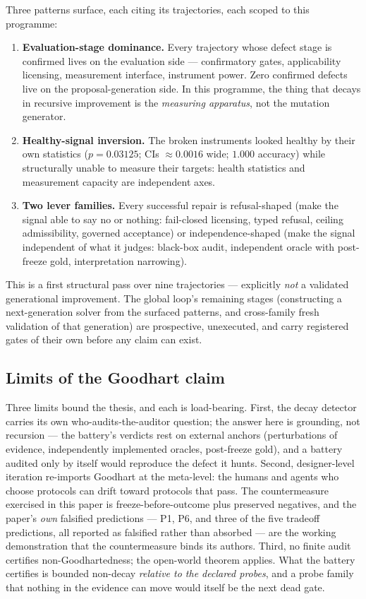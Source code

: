 Three patterns surface, each citing its trajectories, each scoped to this programme:

\begin{enumerate}[leftmargin=1.6em,itemsep=2pt]
\item \textbf{Evaluation-stage dominance.} Every trajectory whose defect stage is
confirmed lives on the evaluation side --- confirmatory gates, applicability
licensing, measurement interface, instrument power. Zero confirmed defects live on
the proposal-generation side. In this programme, the thing that decays in recursive
improvement is the \emph{measuring apparatus}, not the mutation generator.
\item \textbf{Healthy-signal inversion.} The broken instruments looked healthy by
their own statistics ($p=0.03125$; CIs ${\approx}0.0016$ wide; $1.000$ accuracy)
while structurally unable to measure their targets: health statistics and measurement
capacity are independent axes.
\item \textbf{Two lever families.} Every successful repair is refusal-shaped (make
the signal able to say no or nothing: fail-closed licensing, typed refusal, ceiling
admissibility, governed acceptance) or independence-shaped (make the signal
independent of what it judges: black-box audit, independent oracle with post-freeze
gold, interpretation narrowing).
\end{enumerate}

This is a first structural pass over nine trajectories --- explicitly \emph{not} a
validated generational improvement. The global loop's remaining stages (constructing
a next-generation solver from the surfaced patterns, and cross-family fresh
validation of that generation) are prospective, unexecuted, and carry registered
gates of their own before any claim can exist.

\subsection{Limits of the Goodhart claim}
\label{sec:goodhart-limits}

Three limits bound the thesis, and each is load-bearing. First, the decay detector
carries its own who-audits-the-auditor question; the answer here is grounding, not
recursion --- the battery's verdicts rest on external anchors (perturbations of
evidence, independently implemented oracles, post-freeze gold), and a battery audited
only by itself would reproduce the defect it hunts. Second, designer-level iteration
re-imports Goodhart at the meta-level: the humans and agents who choose protocols can
drift toward protocols that pass. The countermeasure exercised in this paper is
freeze-before-outcome plus preserved negatives, and the paper's \emph{own} falsified
predictions --- P1, P6, and three of the five tradeoff predictions, all reported as
falsified rather than absorbed --- are the working demonstration that the
countermeasure binds its authors. Third, no finite audit certifies
non-Goodhartedness; the open-world theorem applies. What the battery certifies is
bounded non-decay \emph{relative to the declared probes}, and a probe family that
nothing in the evidence can move would itself be the next dead gate.
